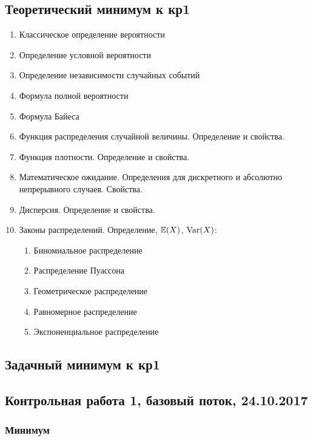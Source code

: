 \subsection{Теоретический минимум к кр1}

\begin{enumerate}
	\item Классическое определение вероятности
	\item Определение условной вероятности
	\item Определение независимости случайных событий
	\item Формула полной вероятности
	\item Формула Байеса
	\item Функция распределения случайной величины. Определение и свойства.
	\item Функция плотности. Определение и свойства.
	\item Математическое ожидание. Определения для дискретного и абсолютно непрерывного случаев. Свойства.
	\item Дисперсия. Определение и свойства.
	\item Законы распределений. Определение, $\mathbb{E}(X)$, $\operatorname{Var}(X)$:
	\begin{enumerate}
	\item Биномиальное распределение
	\item Распределение Пуассона
	\item Геометрическое распределение
	\item Равномерное распределение
	\item Экспоненциальное распределение
	\end{enumerate}
\end{enumerate}


\subsection{Задачный минимум к кр1}




\subsection{Контрольная работа 1, базовый поток, 24.10.2017}

\subsubsection*{Минимум}

